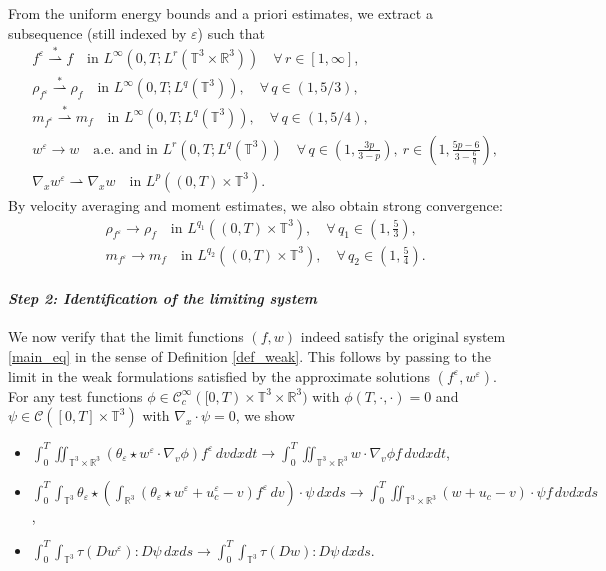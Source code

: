 \documentclass[10pt,reqno]{amsart}
\numberwithin{equation}{section}
\newcommand{\R}{\mathbb R}
\newcommand{\T}{\mathbb T}
\newcommand{\e}{\varepsilon}
\newcommand{\lt}{\left}
\newcommand{\rt}{\right}
\newcommand{\intt}{\int_{\T^3}}
\newcommand{\intr}{\int_{\R^3}}
\newcommand{\inttr}{\iint_{\T^3 \times \R^3}}
\begin{document}
From the uniform energy bounds and a priori estimates, we extract a subsequence (still indexed by $\e$) such that
\[
\begin{aligned}
&f^\e \stackrel{*}{\rightharpoonup} f \quad \text{in } L^\infty(0,T;L^r(\T^3 \times \R^3)) \quad \forall \, r \in [1,\infty],\\
&\rho_{f^\e} \stackrel{*}{\rightharpoonup} \rho_f \quad \text{in } L^\infty(0,T;L^q(\T^3)), \quad \forall \, q \in (1,5/3),\\
&m_{f^\e} \stackrel{*}{\rightharpoonup} m_f \quad \text{in } L^\infty(0,T;L^q(\T^3)), \quad \forall \, q \in (1,5/4),\\
&w^\e \to w \quad \text{a.e. and in } L^r(0,T;L^q(\T^3)) \quad \forall \, q \in \left(1, \frac{3p}{3-p} \right), \ r \in \left(1, \frac{5p-6}{3 - \tfrac{6}{q}} \right),\\
&\nabla_x w^\e \rightharpoonup \nabla_x w \quad \text{in } L^p((0,T)\times \T^3).
\end{aligned}
\]
By velocity averaging and moment estimates, we also obtain strong convergence:
\[
\begin{aligned}
&\rho_{f^\e} \to \rho_f \quad \text{in } L^{q_1}((0,T)\times \T^3), \quad \forall \,q_1 \in \lt(1, \frac53 \rt),\\
&m_{f^\e} \to m_f \quad \text{in } L^{q_2}((0,T)\times \T^3), \quad \forall \, q_2 \in \lt(1, \frac54\rt).
\end{aligned}
\]


\paragraph{\it Step 2: Identification of the limiting system}


We now verify that the limit functions $(f, w)$ indeed satisfy the original system \eqref{main_eq} in the sense of Definition \ref{def_weak}. This follows by passing to the limit in the weak formulations satisfied by the approximate solutions $(f^\e, w^\e)$. For any test functions $\phi\in\mathcal{C}_c^\infty([0,T)\times\T^3\times\R^3)$ with $\phi(T,\cdot, \cdot)=0$ and $\psi \in \mathcal{C}([0,T]\times\T^3)$ with $\nabla_x  \cdot \psi = 0$, we show 
\begin{itemize}
\item[(i)] \quad $\displaystyle \int_0^T \inttr (\theta_\e \star w^\e \cdot \nabla_v \phi) f^\e\,dvdxdt \to \int_0^T \inttr w \cdot \nabla_v \phi f\,dvdxdt$,\\
\item[(ii)] \quad $\displaystyle \int_0^T\intt \theta_\e \star\lt(\intr (\theta_\e \star w^\e + u_c^\e-v) f^\e\,dv\rt) \cdot \psi \,dxds \to \int_0^T\inttr (w+u_c-v)\cdot \psi f\,dvdxds$,\\
\item[(iii)] \quad $\displaystyle \int_0^T \intt \tau(Dw^\e) : D\psi\,dxds \to \int_0^T \intt \tau(Dw) : D\psi\,dxds $.
\end{itemize}
\end{document}
